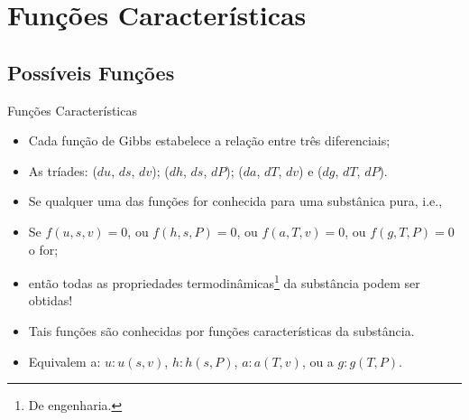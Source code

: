 \section{Funções Características}

\subsection{Possíveis Funções}

    \begin{frame}{Funções Características}
        \begin{itemize}
            \item Cada \alert{função de Gibbs} estabelece a relação entre três diferenciais;
            \item As tríades: \alert{($du$, $ds$, $dv$)}; \alert{($dh$, $ds$, $dP$)};
                \alert{($da$, $dT$, $dv$)} e \alert{($dg$, $dT$, $dP$)}.
            \item Se \alert{qualquer uma} das funções for conhecida para uma \alert{substânica
                pura}, i.e.,
            \item Se \alert{$f(u, s, v) = 0$}, ou \alert{$f(h, s, P) = 0$}, ou \alert{$f(a, T,
                v) = 0$}, ou \alert{$f(g, T, P) = 0$} o for;
            \item então \alert{todas} as propriedades termodinâmicas\footnote{De engenharia.} da
                substância podem ser obtidas!
            \item Tais funções são conhecidas por \alert{funções características} da substância.
            \item Equivalem a: \alert{$u\!:\!u(s, v)$}, \alert{$h\!:\!h(s, P)$},
                \alert{$a\!:\!a(T, v)$}, ou a \alert{$g\!:\!g(T, P)$}.
        \end{itemize}
    \end{frame}

